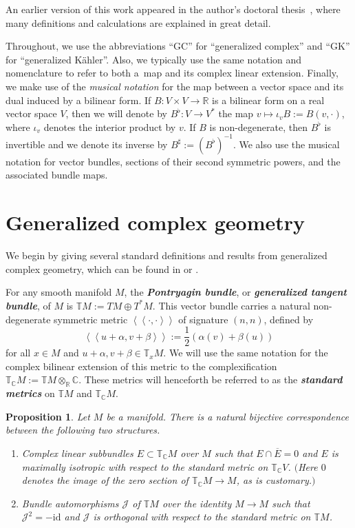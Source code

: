 \documentclass[pdftex]{sigma}
\newtheorem{Proposition}[Theorem]{Proposition}
\numberwithin{equation}{section}
\newcommand{\deff}[1]{\textbf{\emph{#1}}}
\newcommand{\func}[3]{#1 \colon #2 \to #3}
\newcommand{\pont}[1]{\mathbb{T} {#1}}
\newcommand{\cpont}[1]{\mathbb{T}_{\mathbb{C}} {#1}}
\newcommand{\tang}{T}
\newcommand{\iiprod}[2]{\left\langle \! \left\langle {#1} , {#2} \right\rangle \! \right\rangle}
\begin{document}
An earlier version of this work appeared in the author's doctoral thesis~\cite{MyThesis}, where many def\/initions and calculations are explained in great detail.

Throughout, we use the abbreviations ``GC'' for ``generalized complex'' and ``GK'' for ``gene\-ralized K\"ahler''.  Also, we typically use the same notation and nomenclature to refer to both a~map and its complex linear extension.  Finally, we make use of the \emph{musical notation} for the map between a vector space and its dual induced by a bilinear form.  If $\func{B}{V \times V}{\mathbb{R}}$ is a bilinear form on a real vector space $V$, then we will denote by $\func{B^{\flat}}{V}{V^*}$ the map $v \mapsto \iota_v B := B(v, \cdot)$, where $\iota_v$ denotes the interior product by $v$.  If $B$ is non-degenerate, then $B^{\flat}$ is invertible and we denote its inverse by $B^{\sharp} := \left(B^{\flat}\right)^{-1}$.  We also use the musical notation for vector bundles, sections of their second symmetric powers, and the associated bundle maps.



\section{Generalized complex geometry}\label{section1}

We begin by giving several standard def\/initions and results from generalized complex geometry, which can be found in \cite{gualtieri} or \cite{benbassat}.

For any smooth manifold $M$, the \deff{Pontryagin bundle}, or \deff{generalized tangent bundle}, of $M$ is $\pont{M} := \tang M \oplus \tang^* M$.  This vector bundle carries a natural non-degenerate symmetric metric $\iiprod{\cdot}{\cdot}$ of signature $(n,n)$, def\/ined by
\[
  \iiprod{u+\alpha}{v+\beta}
  :=
  \frac{1}{2} \left( \alpha(v) + \beta(u) \right)
\]
for all $x \in M$ and $u+\alpha, v+\beta \in \mathbb{T}_x M$.  We will use the same notation for the complex bilinear extension of this metric to the complexif\/ication $\cpont{M} := \pont{M} \otimes_{\mathbb{R}} \mathbb{C}$.
These metrics will henceforth be referred to as the \deff{standard metrics} on $\pont{M}$ and $\cpont{M}$.


\begin{Proposition} \label{prop4}
Let $M$ be a manifold.
There is a natural bijective correspondence between the following two structures.
  \begin{enumerate}\itemsep=0pt
    \item Complex linear subbundles $E \subset \cpont{M}$ over $M$ such that $E \cap \overline{E} = 0$ and $E$ is maximally isotropic with respect to the standard metric on $\cpont{V}$.  $($Here $0$ denotes the image of the zero section of $\cpont{M} \to M$, as is customary.$)$
    \item Bundle automorphisms $\mathcal{J}$ of $\pont{M}$ over the identity $M \to M$ such that $\mathcal{J}^2 = - \mathrm{id}$ and $\mathcal{J}$ is orthogonal with respect to the standard metric on $\pont{M}$.
  \end{enumerate}
\end{Proposition}
\end{document}
